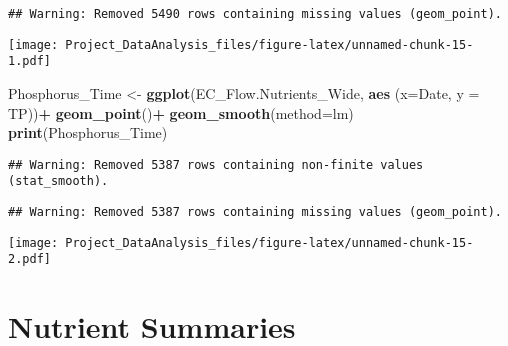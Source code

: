 \documentclass[]{article}
\newenvironment{Shaded}{\begin{snugshade}}{\end{snugshade}}
\newcommand{\DataTypeTok}[1]{\textcolor[rgb]{0.13,0.29,0.53}{#1}}
\newcommand{\KeywordTok}[1]{\textcolor[rgb]{0.13,0.29,0.53}{\textbf{#1}}}
\newcommand{\NormalTok}[1]{#1}
\newcommand{\OperatorTok}[1]{\textcolor[rgb]{0.81,0.36,0.00}{\textbf{#1}}}
\newcommand{\StringTok}[1]{\textcolor[rgb]{0.31,0.60,0.02}{#1}}
\begin{document}
\begin{verbatim}
## Warning: Removed 5490 rows containing missing values (geom_point).
\end{verbatim}

\texttt{[image: Project\_DataAnalysis\_files/figure-latex/unnamed-chunk-15-1.pdf]}

\begin{Shaded}
\begin{Highlighting}[]
\NormalTok{ Phosphorus_Time <-}\StringTok{ }
\StringTok{  }\KeywordTok{ggplot}\NormalTok{(EC_Flow.Nutrients_Wide, }\KeywordTok{aes}\NormalTok{ (}\DataTypeTok{x=}\NormalTok{Date, }\DataTypeTok{y =}\NormalTok{ TP))}\OperatorTok{+}
\StringTok{  }\KeywordTok{geom_point}\NormalTok{()}\OperatorTok{+}
\StringTok{  }\KeywordTok{geom_smooth}\NormalTok{(}\DataTypeTok{method=}\NormalTok{lm)}
\KeywordTok{print}\NormalTok{(Phosphorus_Time)}
\end{Highlighting}
\end{Shaded}

\begin{verbatim}
## Warning: Removed 5387 rows containing non-finite values (stat_smooth).
\end{verbatim}

\begin{verbatim}
## Warning: Removed 5387 rows containing missing values (geom_point).
\end{verbatim}

\texttt{[image: Project\_DataAnalysis\_files/figure-latex/unnamed-chunk-15-2.pdf]}

\hypertarget{nutrient-summaries}{%
\section{Nutrient Summaries}\label{nutrient-summaries}}
\end{document}
